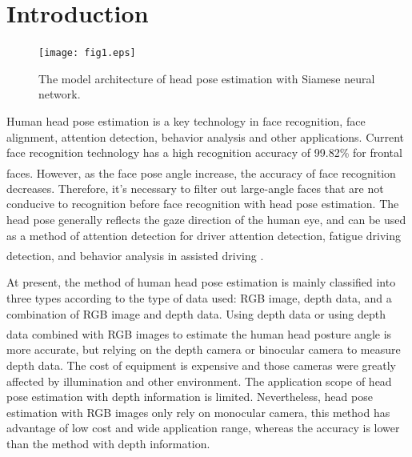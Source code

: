 \documentclass[english]{DDCLSconf}
\newcommand{\upcite}[1]{\textsuperscript{\textsuperscript{\cite{#1}}}}%
\begin{document}


\section{Introduction}

\begin{figure}
	\centering
	
	\texttt{[image: fig1.eps]}
	
	
	\caption{The model architecture of head pose estimation with Siamese neural network. }
	
	\label{model}       %
\end{figure}	

Human head pose estimation is a key technology in face recognition, face alignment, attention detection, behavior analysis and other applications. Current face recognition technology has a high recognition accuracy of 99.82\% for frontal faces\upcite{lightcnn}. However, as the face pose angle increase, the accuracy of face recognition decreases. Therefore, it's necessary to filter out large-angle faces that are not conducive to recognition before face recognition with head pose estimation. The head pose generally reflects the gaze direction of the human eye, and can be used as a method of attention detection for driver attention detection, fatigue driving detection, and behavior analysis in assisted driving \upcite{driver}.

At present, the method of human head pose estimation is mainly classified into three types according to the type of data used: RGB image, depth data, and a combination of RGB image and depth data. Using depth data or using depth data combined with RGB images\upcite{siamese_depth} to estimate the human head posture angle is more accurate, but relying on the depth camera or binocular camera to measure depth data. The cost of equipment is expensive and those cameras were greatly affected by illumination and other environment. The application scope of head pose estimation with depth information is limited. Nevertheless, head pose estimation with RGB images only rely on monocular camera, this method has advantage of low cost and wide application range, whereas the accuracy is lower than the method with depth information.
\end{document}
